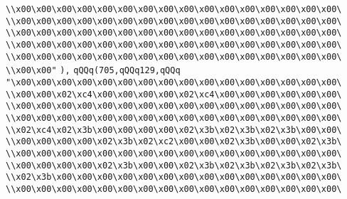 \verb|\\x00\x00\x00\x00\x00\x00\x00\x00\x00\x00\x00\x00\x00\x00\x00\x00\|\newline
\verb|\\x00\x00\x00\x00\x00\x00\x00\x00\x00\x00\x00\x00\x00\x00\x00\x00\|\newline
\verb|\\x00\x00\x00\x00\x00\x00\x00\x00\x00\x00\x00\x00\x00\x00\x00\x00\|\newline
\verb|\\x00\x00\x00\x00\x00\x00\x00\x00\x00\x00\x00\x00\x00\x00\x00\x00\|\newline
\verb|\\x00\x00\x00\x00\x00\x00\x00\x00\x00\x00\x00\x00\x00\x00\x00\x00\|\newline
\verb|\\x00\x00"|\newline
\verb|),|\newline
\verb|qQQq(705,qQQq129,qQQq|\newline
\verb|"\x00\x00\x00\x00\x00\x00\x00\x00\x00\x00\x00\x00\x00\x00\x00\x00\|\newline
\verb|\\x00\x00\x02\xc4\x00\x00\x00\x00\x02\xc4\x00\x00\x00\x00\x00\x00\|\newline
\verb|\\x00\x00\x00\x00\x00\x00\x00\x00\x00\x00\x00\x00\x00\x00\x00\x00\|\newline
\verb|\\x00\x00\x00\x00\x00\x00\x00\x00\x00\x00\x00\x00\x00\x00\x00\x00\|\newline
\verb|\\x02\xc4\x02\x3b\x00\x00\x00\x00\x02\x3b\x02\x3b\x02\x3b\x00\x00\|\newline
\verb|\\x00\x00\x00\x00\x02\x3b\x02\xc2\x00\x00\x02\x3b\x00\x00\x02\x3b\|\newline
\verb|\\x00\x00\x00\x00\x00\x00\x00\x00\x00\x00\x00\x00\x00\x00\x00\x00\|\newline
\verb|\\x00\x00\x00\x00\x02\x3b\x00\x00\x02\x3b\x02\x3b\x02\x3b\x02\x3b\|\newline
\verb|\\x02\x3b\x00\x00\x00\x00\x00\x00\x00\x00\x00\x00\x00\x00\x00\x00\|\newline
\verb|\\x00\x00\x00\x00\x00\x00\x00\x00\x00\x00\x00\x00\x00\x00\x00\x00\|\newline
